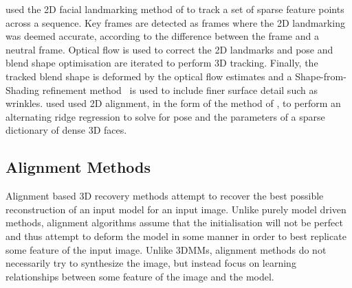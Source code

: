 \citet{Garrido:2013dia} used the 2D facial landmarking method of
\citet{saragih2011deformable} to track a set of sparse feature points across
a sequence. Key frames are detected as frames where the 2D landmarking was
deemed accurate, according to the difference between the frame and a neutral
frame. Optical flow is used to correct the 2D landmarks and pose and blend shape
optimisation are iterated to perform 3D tracking. Finally, the tracked
blend shape is deformed by the optical flow estimates and a Shape-from-Shading
refinement method~\cite{valgaerts2012lightweight} is used to include finer
surface detail such as wrinkles. \citet{ferrari2015dictionary} used used
2D alignment, in the form of the method of
\citet{xiong2013supervised}, to perform
an alternating ridge regression to solve for pose and the parameters of a sparse
dictionary of dense 3D faces.
\subsection{Alignment Methods}\label{subsec:bg_model_based_alignment}
Alignment based 3D recovery methods attempt to recover the best possible
reconstruction of an input model for an input image. Unlike purely model
driven methods, alignment algorithms assume that the initialisation will not be
perfect and thus attempt to deform the model in some manner in order to best
replicate some feature of the input image. Unlike 3DMMs, alignment methods
do not necessarily try to synthesize the image, but instead focus on learning
relationships between some feature of the image and the model.

